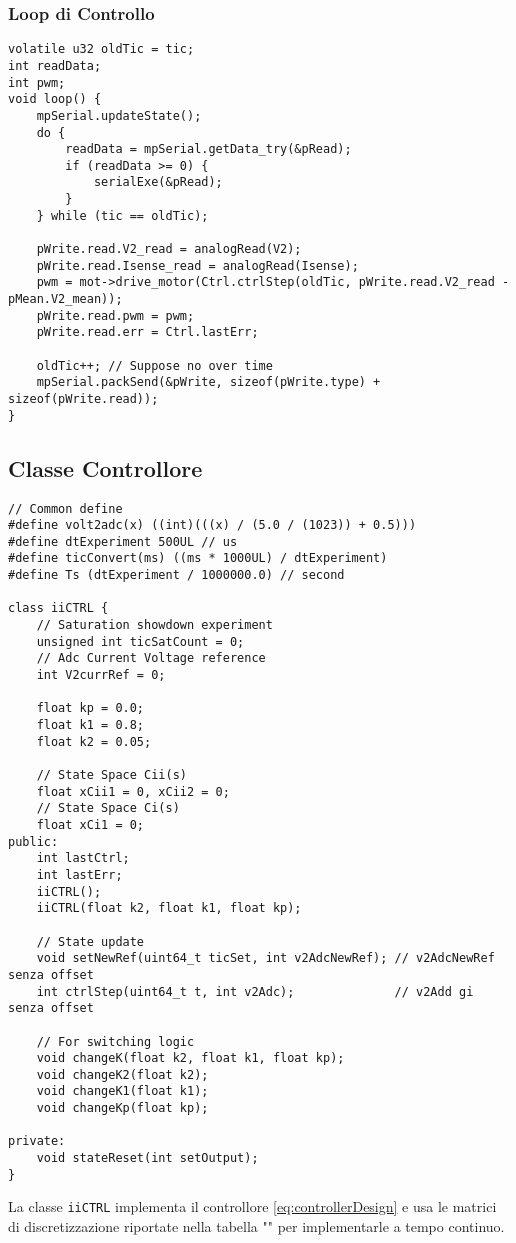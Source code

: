 \subsubsection{Loop di Controllo}
\begin{lstlisting}[style=cppStyle,caption={Loop di Controllo},label=lst:controlLoop] 
volatile u32 oldTic = tic;
int readData;
int pwm;
void loop() {
	mpSerial.updateState();
	do {
		readData = mpSerial.getData_try(&pRead);
		if (readData >= 0) {
			serialExe(&pRead);
		}
	} while (tic == oldTic);
	
	pWrite.read.V2_read = analogRead(V2);
	pWrite.read.Isense_read = analogRead(Isense);
	pwm = mot->drive_motor(Ctrl.ctrlStep(oldTic, pWrite.read.V2_read - pMean.V2_mean));
	pWrite.read.pwm = pwm;
	pWrite.read.err = Ctrl.lastErr;
	
	oldTic++; // Suppose no over time
	mpSerial.packSend(&pWrite, sizeof(pWrite.type) + sizeof(pWrite.read));
}
\end{lstlisting}

\subsection{Classe Controllore}
\begin{lstlisting}[style=cppStyle,caption={Header Classe controllore C(s)},label=lst:controlClassH] 
// Common define
#define volt2adc(x) ((int)(((x) / (5.0 / (1023)) + 0.5)))
#define dtExperiment 500UL // us
#define ticConvert(ms) ((ms * 1000UL) / dtExperiment)
#define Ts (dtExperiment / 1000000.0) // second

class iiCTRL {
	// Saturation showdown experiment
	unsigned int ticSatCount = 0;
	// Adc Current Voltage reference
	int V2currRef = 0;
	
	float kp = 0.0;
	float k1 = 0.8;
	float k2 = 0.05;
	
	// State Space Cii(s)
	float xCii1 = 0, xCii2 = 0;
	// State Space Ci(s)
	float xCi1 = 0;
public:
	int lastCtrl;
	int lastErr;
	iiCTRL();
	iiCTRL(float k2, float k1, float kp);
	
	// State update
	void setNewRef(uint64_t ticSet, int v2AdcNewRef); // v2AdcNewRef senza offset
	int ctrlStep(uint64_t t, int v2Adc);              // v2Add gi senza offset
	
	// For switching logic
	void changeK(float k2, float k1, float kp);
	void changeK2(float k2);
	void changeK1(float k1);
	void changeKp(float kp);
	
private:
	void stateReset(int setOutput);
}
\end{lstlisting}
\noindent
La classe \verb|iiCTRL| implementa il controllore \ref{eq:controllerDesign} e usa le matrici di discretizzazione riportate nella tabella "" per implementarle a tempo continuo.
\newpage

